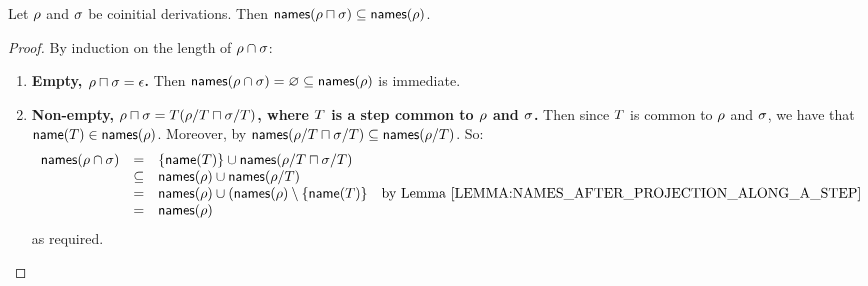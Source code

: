 \begin{lemma}
Let $\rho$ and $\sigma$ be coinitial derivations.
Then $\mathsf{names}(\rho \sqcap \sigma) \subseteq \mathsf{names}(\rho)$.
\end{lemma}
\begin{proof}
By induction on the length of $\rho \cap \sigma$:
\begin{enumerate}
\item {\bf Empty, $\rho \sqcap \sigma = \epsilon$.}
      Then $\mathsf{names}(\rho \cap \sigma) = \varnothing \subseteq \mathsf{names}(\rho)$ is immediate.
\item {\bf Non-empty, $\rho \sqcap \sigma = T(\rho/T \sqcap \sigma/T)$,
           where $T$ is a step common to $\rho$ and $\sigma$.}
      Then since $T$ is common to $\rho$ and $\sigma$,
      we have that $\mathsf{name}(T) \in \mathsf{names}(\rho)$.
      Moreover, by \ih $\mathsf{names}(\rho/T \sqcap \sigma/T) \subseteq \mathsf{names}(\rho/T)$.
      So:
      \[
        \begin{array}{rcll}
        \names(\redseq \cap \redseqtwo) & = & \set{\name(\redexthree)} \cup \names(\redseq/\redexthree \sqcap \redseqtwo/\redexthree) \\
                                        & \subseteq & \names(\redseq) \cup \names(\redseq/\redexthree) \\
                                        & = & \names(\redseq) \cup (\names(\redseq) \setminus \set{\name(\redexthree)} & \text{by \rlem{names_after_projection_along_a_step}} \\
                                        & = & \names(\redseq)
        \end{array}
      \]
      as required.
\end{enumerate}
\end{proof}


